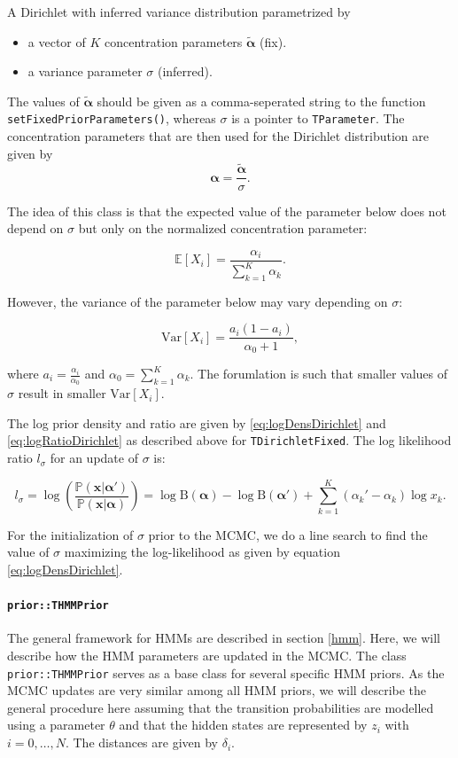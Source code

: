 \documentclass[a4paper,11pt]{article}
\def\x{\boldsymbol{x}}
\def\balpha{\boldsymbol{\alpha}}
\def\Var{\mbox{Var}}
\def\p{\mathbb{P}}
\def\E{\mathbb{E}}
\newcommand{\class}[1]{\texttt{#1}}
\newcommand{\pubfunc}[1]{\texttt{#1()}}
\begin{document}
A Dirichlet with inferred variance distribution parametrized by
\begin{itemize}
 \item a vector of $K$ concentration parameters $\tilde{\balpha}$ (fix).
 \item a variance parameter $\sigma$ (inferred).
\end{itemize}
The values of $\tilde{\balpha}$ should be given as a comma-seperated string to the function \pubfunc{setFixedPriorParameters}, whereas $\sigma$ is a pointer to \class{TParameter}. The concentration parameters that are then used for the Dirichlet distribution are given by
\begin{equation*}
 \balpha = \frac{\tilde{\balpha}}{\sigma}.
\end{equation*}

The idea of this class is that the expected value of the parameter below does not depend on $\sigma$ but only on the normalized concentration parameter:

\begin{equation*}
 \E[X_i] = \frac{\alpha_i}{\sum_{k=1}^K \alpha_k}.
\end{equation*}

However, the variance of the parameter below may vary depending on $\sigma$:

\begin{equation*}
 \Var[X_i] = \frac{a_i (1 - a_i)}{\alpha_0 + 1},
\end{equation*}

where $a_i = \frac{\alpha_i}{\alpha_0}$ and $\alpha_0 = \sum_{k=1}^K \alpha_k$. The forumlation is such that smaller values of $\sigma$ result in smaller $\Var[X_i]$.

The log prior density and ratio are given by \ref{eq:logDensDirichlet} and \ref{eq:logRatioDirichlet} as described above for \class{TDirichletFixed}.
The log likelihood ratio $l_{\sigma}$ for an update of $\sigma$ is:

\begin{equation*}
 l_{\sigma} = \log \left( \frac{\p(\x | \balpha')}{\p(\x | \balpha)} \right) = \log \text{B}(\balpha) - \log \text{B}(\balpha') + \sum_{k=1}^K (\alpha_k' - \alpha_k) \log x_k.
\end{equation*}

For the initialization of $\sigma$ prior to the MCMC, we do a line search to find the value of $\sigma$ maximizing the log-likelihood as given by equation \ref{eq:logDensDirichlet}.

\paragraph{\class{prior::THMMPrior}}
The general framework for HMMs are described in section \ref{hmm}. Here, we will describe how the HMM parameters are updated in the MCMC. The class \class{prior::THMMPrior} serves as a base class for several specific HMM priors. As the MCMC updates are very similar among all HMM priors, we will describe the general procedure here assuming that the transition probabilities are modelled using a parameter $\theta$ and that the hidden states are represented by $z_i$ with $i= 0, \ldots, N$. The distances are given by $\delta_i$.
\end{document}

